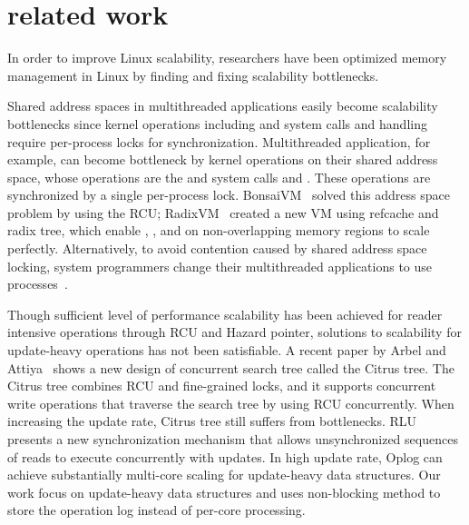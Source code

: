\section{related work} \label{sec:RelatedWork}
In order to improve Linux scalability, researchers have been optimized memory
management in Linux by finding and fixing scalability bottlenecks.

Shared address spaces in multithreaded applications 
easily become scalability bottlenecks since kernel operations 
including  and  system calls and 
 handling require per-process locks for synchronization.
Multithreaded application, for example, can become bottleneck by kernel
operations on their shared address space, whose operations are the 
and  system calls and .
These operations are synchronized by a single per-process lock.
BonsaiVM~\cite{AustinTClements2012RCUBalancedTrees} solved this address space
problem by using the RCU;
RadixVM~\cite{Clements2013RadixVM} created a new VM using refcache and radix
tree, which enable , , and  on
non-overlapping memory regions to scale perfectly.
Alternatively, to avoid contention caused by shared address space locking,
system programmers change their multithreaded applications to use
processes~\cite{SilasBoydWickizer2010LinuxScales48}.


Though sufficient level of performance scalability has been achieved for 
reader intensive operations through RCU and Hazard pointer, 
solutions to scalability for update-heavy operations has not been satisfiable.
A recent paper by Arbel and Attiya~\cite{Arbel2014ConcurrentRCU} shows a new
design of concurrent search tree called the Citrus tree. The Citrus tree
combines RCU and fine-grained locks, and it supports concurrent write
operations that traverse the search tree by using RCU concurrently.
When increasing the update rate, Citrus tree still suffers from bottlenecks.
RLU~\cite{Matveev2015RLU} presents a new synchronization mechanism that allows
unsynchronized sequences of reads to execute concurrently with updates.
In high update rate, Oplog can achieve substantially multi-core scaling for
update-heavy data structures.
Our work focus on update-heavy data structures and uses non-blocking method to
 store the operation log instead of per-core processing.



